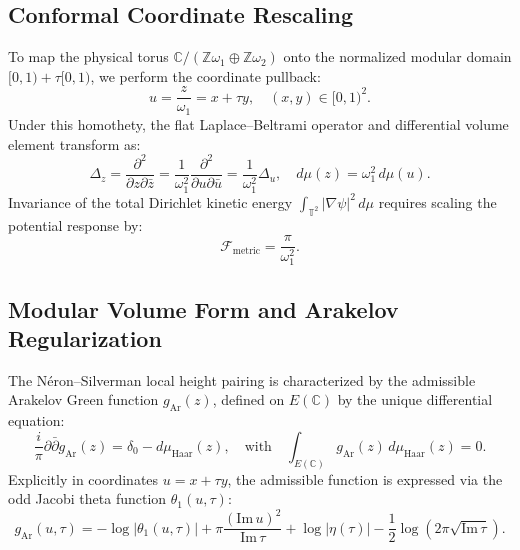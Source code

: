 \documentclass[11pt,reqno]{amsart}
\theoremstyle{definition}
\begin{document}
\subsection{Conformal Coordinate Rescaling}
To map the physical torus $\mathbb{C}/(\mathbb{Z}\omega_1 \oplus \mathbb{Z}\omega_2)$ onto the normalized modular domain $[0, 1) + \tau [0, 1)$, we perform the coordinate pullback:
\begin{equation}
u = \frac{z}{\omega_1} = x + \tau y, \quad (x, y) \in [0, 1)^2.
\end{equation}
Under this homothety, the flat Laplace--Beltrami operator and differential volume element transform as:
\begin{equation}
\Delta_z = \frac{\partial^2}{\partial z \partial \bar{z}} = \frac{1}{\omega_1^2} \frac{\partial^2}{\partial u \partial \bar{u}} = \frac{1}{\omega_1^2} \Delta_u, \quad d\mu(z) = \omega_1^2 \, d\mu(u).
\end{equation}
Invariance of the total Dirichlet kinetic energy $\int_{\mathbb{T}^2} |\nabla \psi|^2 \, d\mu$ requires scaling the potential response by:
\begin{equation}
\mathcal{F}_{\mathrm{metric}} = \frac{\pi}{\omega_1^2}.
\end{equation}

\subsection{Modular Volume Form and Arakelov Regularization}
The Néron--Silverman local height pairing is characterized by the admissible Arakelov Green function $g_{\mathrm{Ar}}(z)$, defined on $E(\mathbb{C})$ by the unique differential equation:
\begin{equation}
\frac{i}{\pi} \partial \bar{\partial} g_{\mathrm{Ar}}(z) = \delta_0 - d\mu_{\mathrm{Haar}}(z), \quad \text{with} \quad \int_{E(\mathbb{C})} g_{\mathrm{Ar}}(z) \, d\mu_{\mathrm{Haar}}(z) = 0.
\end{equation}
Explicitly in coordinates $u = x + \tau y$, the admissible function is expressed via the odd Jacobi theta function $\theta_1(u, \tau)$:
\begin{equation}
g_{\mathrm{Ar}}(u, \tau) = -\log |\theta_1(u, \tau)| + \pi \frac{(\mathrm{Im}\, u)^2}{\mathrm{Im}\,\tau} + \log |\eta(\tau)| - \frac{1}{2} \log(2\pi \sqrt{\mathrm{Im}\,\tau}).
\end{equation}
\end{document}
